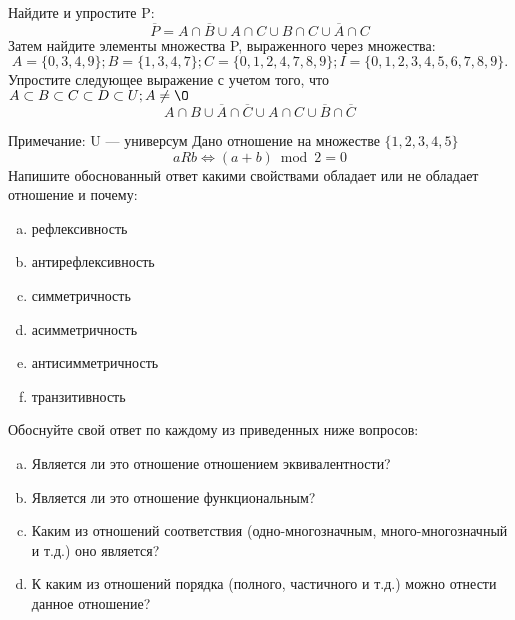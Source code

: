 \documentclass[10pt]{exam}
\begin{document}
\begin{questions}
\question
Найдите и упростите P:
\begin{equation*}
\overline{P} = A \cap \overline{B} \cup A \cap C \cup B \cap C \cup \overline{A} \cap C
\end{equation*}
Затем найдите элементы множества P, выраженного через множества:
\begin{equation*}
A = \{0, 3, 4, 9\}; 
B = \{1, 3, 4, 7\};
C = \{0, 1, 2, 4, 7, 8, 9\};
I = \{0, 1, 2, 3, 4, 5, 6, 7, 8, 9\}.
\end{equation*}\question
Упростите следующее выражение с учетом того, что $A\subset B \subset C \subset D \subset U; A \neq \O$
\begin{equation*}
A \cap B \cup \overline{A} \cap \overline{C} \cup A \cap C \cup \overline{B} \cap \overline{C}
\end{equation*}

Примечание: U — универсум\question
Дано отношение на множестве $\{1, 2, 3, 4, 5\}$ 
\begin{equation*}
aRb \iff (a+b) \bmod 2 =0
\end{equation*}
Напишите обоснованный ответ какими свойствами обладает или не обладает отношение и почему:   
\begin{enumerate} [a)]\setcounter{enumi}{0}
\item рефлексивность
\item антирефлексивность
\item симметричность
\item асимметричность
\item антисимметричность
\item транзитивность
\end{enumerate}

Обоснуйте свой ответ по каждому из приведенных ниже вопросов:
\begin{enumerate} [a)]\setcounter{enumi}{0}
    \item Является ли это отношение отношением эквивалентности?
    \item Является ли это отношение функциональным?
    \item Каким из отношений соответствия (одно-многозначным, много-многозначный и т.д.) оно является?
    \item К каким из отношений порядка (полного, частичного и т.д.) можно отнести данное отношение?
\end{enumerate}




\end{questions}
\end{document}
